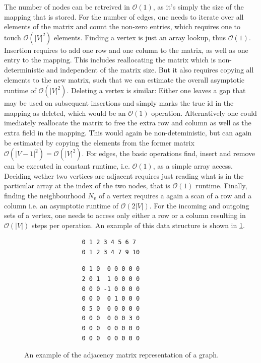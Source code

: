             The number of nodes can be retreived in $\mathcal{O}(1)$, as it's simply the size of the mapping that is stored.
            For the number of edges, one needs to iterate over all elements of the matrix and count the non-zero entries, which requires one to touch $\mathcal{O}(|V|^2)$ elements.
            Finding a vertex is just an array lookup, thus $\mathcal{O}(1)$.
            Insertion requires to add one row and one column to the matrix, as well as one entry to the mapping. 
            This includes reallocating the matrix which is non-deterministic and independent of the matrix size. But it also requires copying all elements to the new matrix, such that we can estimate the overall asymptotic runtime of $\mathcal{O}(|V|^2)$.
            Deleting a vertex is similar: Either one leaves a gap that may be used on subsequent insertions and simply marks the true id in the mapping as deleted, which would be an $\mathcal{O}(1)$ operation. 
            Alternatively one could imediately reallocate the matrix to free the extra row and column as well as the extra field in the mapping. 
            This would again be non-deteministic, but can again be estimated by copying the elements from the former matrix $\mathcal{O}(|V-1|^2) = \mathcal{O}(|V|^2)$.
            For edges, the basic operations find, insert and remove can be executed in constant runtime, i.e. $\mathcal{O}(1)$, as a simple array access.
            Deciding wether two vertices are adjacent requires just reading what is in the particular array at the index of the two nodes, that is $\mathcal{O}(1)$ runtime.
            Finally, finding the neighbourhood $N_v$ of a vertex requires a again a scan of a row and a column i.e. an asymptotic runtime of $\mathcal{O}(2|V|)$. For the incoming and outgoing sets of a vertex, one needs to access only either a row or a column resulting in $\mathcal{O}(|V|)$ steps per operation.
            An example of this data structure is shown in \ref{adm}.
            
            \begin{figure}[htp]
            \begin{center}
            \begin{verbatim}
                0 1 2 3 4 5 6 7
                0 1 2 3 4 7 9 10
            \end{verbatim}
            \begin{verbatim}
                0 1 0  0 0 0 0 0
                2 0 1  1 0 0 0 0
                0 0 0 -1 0 0 0 0
                0 0 0  0 1 0 0 0
                0 5 0  0 0 0 0 0
                0 0 0  0 0 0 3 0
                0 0 0  0 0 0 0 0
                0 0 0  0 0 0 0 0
            \end{verbatim}
            \end{center}
            \caption{An example of the adjacency matrix representation of a graph.}
            \label{adm}
            \end{figure}
        
